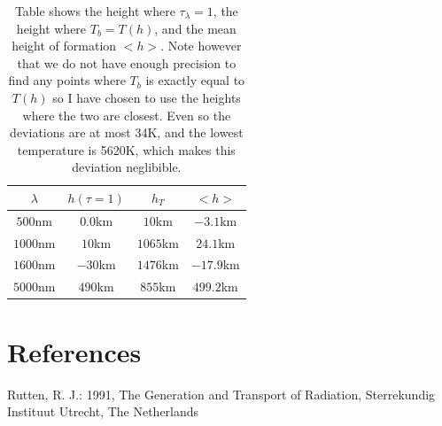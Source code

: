 \documentclass{aa}   %
\begin{document}
\begin{table}
\begin{tabular}{|c|c|c|c|}
\hline
$\lambda$&$h(\tau = 1)$ & $h_T$ &$<h>$ \\
\hline
$500$nm& $0.0$km &$10$km & $-3.1$km\\
\hline
$1000$nm&$10$km& $1065$km & $24.1$km\\
\hline
$1600$nm&$-30$km & $1476$km &$-17.9$km\\
\hline
$5000$nm&$490$km & $855$km & $499.2$km\\
\hline
\end{tabular}
\caption{Table shows the height where $\tau_\lambda = 1$, the height where $T_b = T(h)$, and the mean height of formation $<h>$. Note however that we do not have enough precision to find any points where $T_b$ is exactly equal to $T(h)$ so I have chosen to use the heights where the two are closest. Even so the deviations are at most 34K, and the lowest temperature is 5620K, which makes this deviation neglibible.}
\label{ebtable}
\end{table}




\section{References}
Rutten, R. J.: 1991, The Generation and Transport of Radiation, Sterrekundig Instituut Utrecht, The Netherlands

\end{document}
